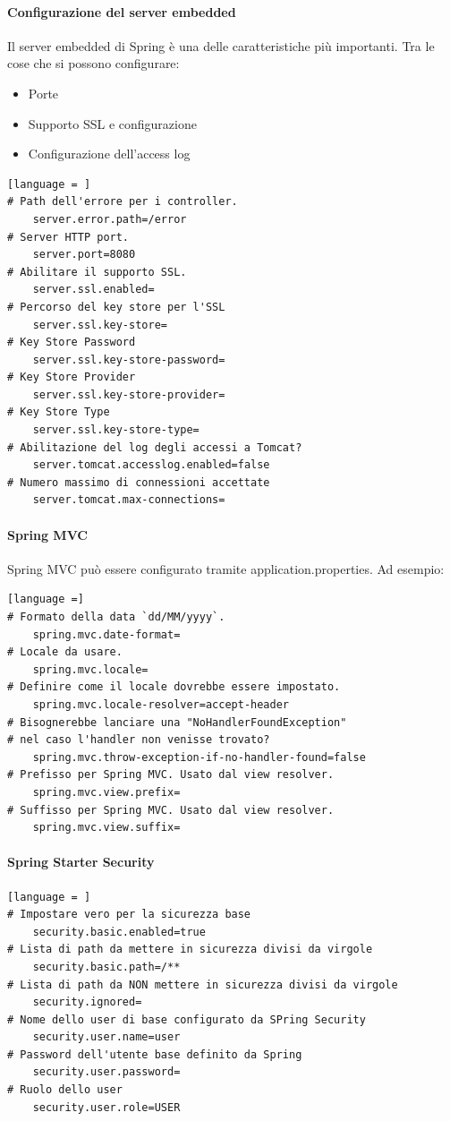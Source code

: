 \documentclass[11pt,a4paper]{book}
\begin{document}
\paragraph{Configurazione del server embedded}
Il server embedded di Spring è una delle caratteristiche più importanti. Tra le cose che si possono configurare:
\begin{itemize}
	\item Porte
	\item Supporto SSL e configurazione
	\item Configurazione dell'access log
\end{itemize}

\begin{lstlisting}[language = ]
# Path dell'errore per i controller.
	server.error.path=/error
# Server HTTP port.
	server.port=8080
# Abilitare il supporto SSL.
	server.ssl.enabled=
# Percorso del key store per l'SSL
	server.ssl.key-store=
# Key Store Password
	server.ssl.key-store-password=
# Key Store Provider	
	server.ssl.key-store-provider=
# Key Store Type
	server.ssl.key-store-type=
# Abilitazione del log degli accessi a Tomcat?
	server.tomcat.accesslog.enabled=false
# Numero massimo di connessioni accettate
	server.tomcat.max-connections=
\end{lstlisting}

\paragraph{Spring MVC}
Spring MVC può essere configurato tramite application.properties. Ad esempio:
\begin{lstlisting}[language =]
# Formato della data `dd/MM/yyyy`.
	spring.mvc.date-format=
# Locale da usare.
	spring.mvc.locale=
# Definire come il locale dovrebbe essere impostato.
	spring.mvc.locale-resolver=accept-header
# Bisognerebbe lanciare una "NoHandlerFoundException"
# nel caso l'handler non venisse trovato?
	spring.mvc.throw-exception-if-no-handler-found=false
# Prefisso per Spring MVC. Usato dal view resolver.
	spring.mvc.view.prefix=
# Suffisso per Spring MVC. Usato dal view resolver.
	spring.mvc.view.suffix=
\end{lstlisting}

\paragraph{Spring Starter Security}

\begin{lstlisting}[language = ]
# Impostare vero per la sicurezza base
	security.basic.enabled=true
# Lista di path da mettere in sicurezza divisi da virgole
	security.basic.path=/**
# Lista di path da NON mettere in sicurezza divisi da virgole
	security.ignored=
# Nome dello user di base configurato da SPring Security
	security.user.name=user
# Password dell'utente base definito da Spring
	security.user.password=
# Ruolo dello user
	security.user.role=USER
\end{lstlisting}
\end{document}
